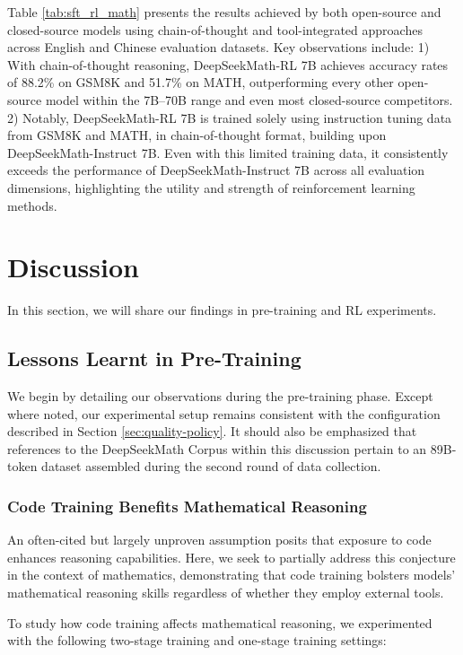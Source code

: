 \begin{itemize}[topsep=0pt]
\begin{itemize}[topsep=0pt]
Table \ref{tab:sft_rl_math} presents the results achieved by both open-source and closed-source models using chain-of-thought and tool-integrated approaches across English and Chinese evaluation datasets. Key observations include: 1) With chain-of-thought reasoning, DeepSeekMath-RL 7B achieves accuracy rates of 88.2\% on GSM8K and 51.7\% on MATH, outperforming every other open-source model within the 7B–70B range and even most closed-source competitors. 2) Notably, DeepSeekMath-RL 7B is trained solely using instruction tuning data from GSM8K and MATH, in chain-of-thought format, building upon DeepSeekMath-Instruct 7B. Even with this limited training data, it consistently exceeds the performance of DeepSeekMath-Instruct 7B across all evaluation dimensions, highlighting the utility and strength of reinforcement learning methods.

\section{Discussion}
In this section, we will share our findings in pre-training and RL experiments. 

\subsection{Lessons Learnt in Pre-Training}

We begin by detailing our observations during the pre-training phase. Except where noted, our experimental setup remains consistent with the configuration described in Section \ref{sec:quality-policy}. It should also be emphasized that references to the DeepSeekMath Corpus within this discussion pertain to an 89B-token dataset assembled during the second round of data collection.

\subsubsection{Code Training Benefits Mathematical Reasoning}

An often-cited but largely unproven assumption posits that exposure to code enhances reasoning capabilities. Here, we seek to partially address this conjecture in the context of mathematics, demonstrating that code training bolsters models' mathematical reasoning skills regardless of whether they employ external tools.

To study how code training affects mathematical reasoning, we experimented with the following two-stage training and one-stage training settings:


\end{itemize}
\end{itemize}
